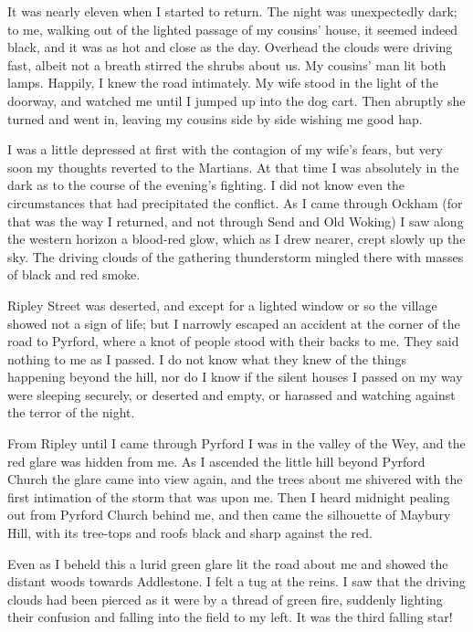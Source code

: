 It was nearly eleven when I started to return. The night was
unexpectedly dark; to me, walking out of the lighted passage of my
cousins' house, it seemed indeed black, and it was as hot and close
as the day. Overhead the clouds were driving fast, albeit not a
breath stirred the shrubs about us. My cousins' man lit both lamps.
Happily, I knew the road intimately. My wife stood in the light of
the doorway, and watched me until I jumped up into the dog cart.
Then abruptly she turned and went in, leaving my cousins side by
side wishing me good hap.

I was a little depressed at first with the contagion of my wife's
fears, but very soon my thoughts reverted to the Martians. At that
time I was absolutely in the dark as to the course of the evening's
fighting. I did not know even the circumstances that had
precipitated the conflict. As I came through Ockham (for that was
the way I returned, and not through Send and Old Woking) I saw
along the western horizon a blood-red glow, which as I drew nearer,
crept slowly up the sky. The driving clouds of the gathering
thunderstorm mingled there with masses of black and red smoke.

Ripley Street was deserted, and except for a lighted window or so
the village showed not a sign of life; but I narrowly escaped an
accident at the corner of the road to Pyrford, where a knot of
people stood with their backs to me. They said nothing to me as I
passed. I do not know what they knew of the things happening beyond
the hill, nor do I know if the silent houses I passed on my way
were sleeping securely, or deserted and empty, or harassed and
watching against the terror of the night.

From Ripley until I came through Pyrford I was in the valley of the
Wey, and the red glare was hidden from me. As I ascended the little
hill beyond Pyrford Church the glare came into view again, and the
trees about me shivered with the first intimation of the storm that
was upon me. Then I heard midnight pealing out from Pyrford Church
behind me, and then came the silhouette of Maybury Hill, with its
tree-tops and roofs black and sharp against the red.

Even as I beheld this a lurid green glare lit the road about me and
showed the distant woods towards Addlestone. I felt a tug at the
reins. I saw that the driving clouds had been pierced as it were by
a thread of green fire, suddenly lighting their confusion and
falling into the field to my left. It was the third falling star!

